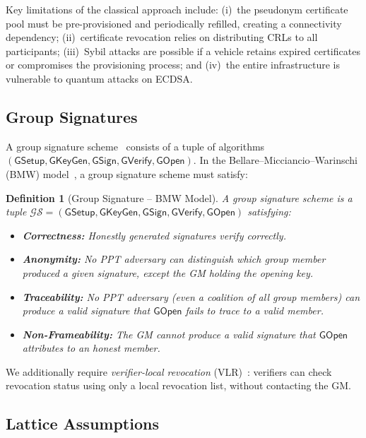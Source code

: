 \documentclass[conference,10pt]{IEEEtran}
\newtheorem{definition}{Definition}
\begin{document}
Key limitations of the classical approach include: (i)~the pseudonym certificate pool must be pre-provisioned and periodically refilled, creating a connectivity dependency; (ii)~certificate revocation relies on distributing CRLs to all participants; (iii)~Sybil attacks are possible if a vehicle retains expired certificates or compromises the provisioning process; and (iv)~the entire infrastructure is vulnerable to quantum attacks on ECDSA.

\subsection{Group Signatures}

A group signature scheme~\cite{bellare2003} consists of a tuple of algorithms $(\mathsf{GSetup}, \mathsf{GKeyGen}, \mathsf{GSign}, \mathsf{GVerify}, \mathsf{GOpen})$. In the Bellare--Micciancio--Warinschi (BMW) model~\cite{bellare2003}, a group signature scheme must satisfy:

\begin{definition}[Group Signature -- BMW Model]
A group signature scheme is a tuple $\mathcal{GS} = (\mathsf{GSetup}, \mathsf{GKeyGen}, \mathsf{GSign}, \mathsf{GVerify}, \mathsf{GOpen})$ satisfying:
\begin{itemize}
    \item \textbf{Correctness:} Honestly generated signatures verify correctly.
    \item \textbf{Anonymity:} No PPT adversary can distinguish which group member produced a given signature, except the GM holding the opening key.
    \item \textbf{Traceability:} No PPT adversary (even a coalition of all group members) can produce a valid signature that $\mathsf{GOpen}$ fails to trace to a valid member.
    \item \textbf{Non-Frameability:} The GM cannot produce a valid signature that $\mathsf{GOpen}$ attributes to an honest member.
\end{itemize}
\end{definition}

We additionally require \emph{verifier-local revocation} (VLR)~\cite{langlois2014}: verifiers can check revocation status using only a local revocation list, without contacting the GM.

\subsection{Lattice Assumptions}
\end{document}
